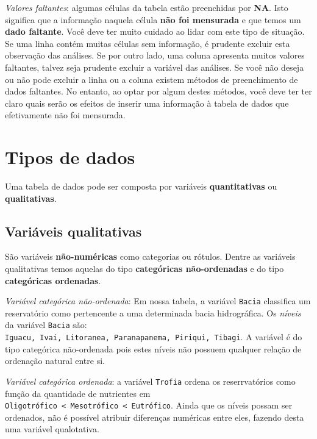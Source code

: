 \documentclass[
]{book}
\begin{document}
\emph{Valores faltantes}: algumas células da tabela estão preenchidas por \textbf{NA}. Isto significa que a informação naquela célula \textbf{não foi mensurada} e que temos um \textbf{dado faltante}. Você deve ter muito cuidado ao lidar com este tipo de situação. Se uma linha contém muitas células sem informação, é prudente excluir esta observação das análises. Se por outro lado, uma coluna apresenta muitos valores faltantes, talvez seja prudente excluir a variável das análises. Se você não deseja ou não pode excluir a linha ou a coluna existem métodos de preenchimento de dados faltantes. No entanto, ao optar por algum destes métodos, você deve ter ter claro quais serão os efeitos de inserir uma informação à tabela de dados que efetivamente não foi mensurada.

\hypertarget{tipos-de-dados}{%
\section{Tipos de dados}\label{tipos-de-dados}}

Uma tabela de dados pode ser composta por variáveis \textbf{quantitativas} ou \textbf{qualitativas}.

\hypertarget{variuxe1veis-qualitativas}{%
\subsection{Variáveis qualitativas}\label{variuxe1veis-qualitativas}}

São variáveis \textbf{não-numéricas} como categorias ou rótulos. Dentre as variáveis qualitativas temos aquelas do tipo \textbf{categóricas não-ordenadas} e do tipo \textbf{categóricas ordenadas}.

\emph{Variável categórica não-ordenada}: Em nossa tabela, a variável \texttt{Bacia} classifica um reservatório como pertencente a uma determinada bacia hidrográfica. Os \emph{níveis} da variável \texttt{Bacia} são: \texttt{Iguacu,\ Ivai,\ Litoranea,\ Paranapanema,\ Piriqui,\ Tibagi}. A variável é do tipo categórica não-ordenada pois estes níveis não possuem qualquer relação de ordenação natural entre si.

\emph{Variável categórica ordenada}: a variável \texttt{Trofia} ordena os reserrvatórios como função da quantidade de nutrientes em \texttt{Oligotrófico\ \textless{}\ Mesotrófico\ \textless{}\ Eutrófico}. Ainda que os níveis possam ser ordenados, não é possível atribuir diferenças numéricas entre eles, fazendo desta uma variável qualotativa.
\end{document}
